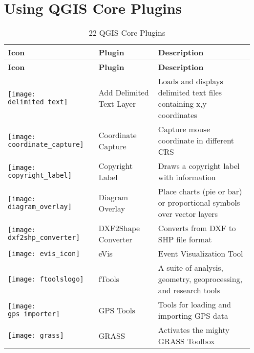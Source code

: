 
\chapter{Using QGIS Core Plugins}\label{sec:core_plugins}



{\setlength{\extrarowheight}{15pt}
\small
\begin{longtable}{|p{1.2cm}|p{3.8cm}|p{10.5cm}|}
\caption{22 QGIS Core Plugins}\label{tab:core_plugins} \\
\hline
 \textbf{Icon} & \textbf{Plugin} & \textbf{Description}\\
\endfirsthead
\hline
\textbf{Icon} & \textbf{Plugin} & \textbf{Description}\\
\endhead
\hline
\texttt{[image: delimited\_text]}
 & Add Delimited Text Layer \index{plugins!delimited text} & Loads and displays delimited text files containing x,y coordinates\\
\hline
\texttt{[image: coordinate\_capture]}
 & Coordinate Capture \index{plugins!coordinate capture}& Capture mouse coordinate in different CRS\\
\hline 
\texttt{[image: copyright\_label]}
 & Copyright Label \index{plugins!copyright}& Draws a copyright label with information\\
\hline
\texttt{[image: diagram\_overlay]}
 & Diagram Overlay \index{plugins!diagram}& Place charts (pie or bar) or proportional symbols over vector layers\\
\hline
\texttt{[image: dxf2shp\_converter]}
 & DXF2Shape Converter \index{plugins!DXF2Shape}& Converts from DXF to SHP file format\\
\hline
\texttt{[image: evis\_icon]}
 & eVis & Event Visualization Tool \\
\hline
\texttt{[image: ftoolslogo]}
 & fTools \index{plugins!ftools}& A suite of analysis, geometry, geoprocessing, and research tools\\
\hline
\texttt{[image: gps\_importer]}
 & GPS Tools \index{plugins!gps}& Tools for loading and importing GPS data\\
\hline
\texttt{[image: grass]}
 & GRASS \index{plugin!grass toolbox} & Activates the mighty GRASS Toolbox\\

\end{longtable}}
